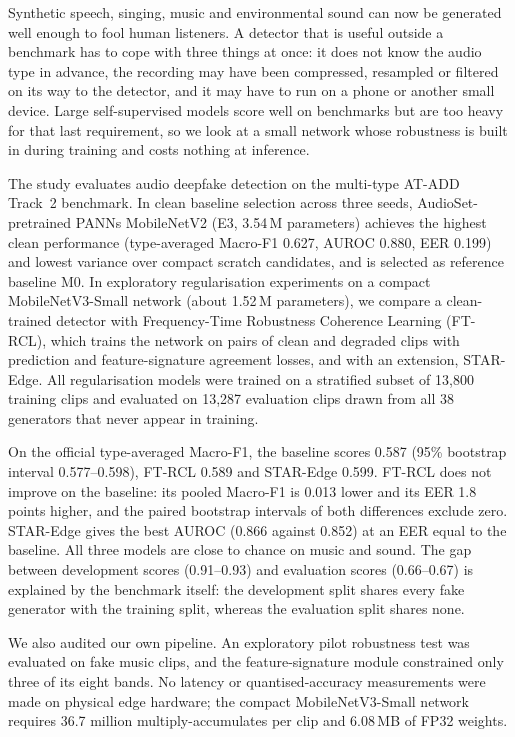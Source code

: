 Synthetic speech, singing, music and environmental sound can now be generated well enough to fool human listeners. A detector that is useful outside a benchmark has to cope with three things at once: it does not know the audio type in advance, the recording may have been compressed, resampled or filtered on its way to the detector, and it may have to run on a phone or another small device. Large self-supervised models score well on benchmarks but are too heavy for that last requirement, so we look at a small network whose robustness is built in during training and costs nothing at inference.

The study evaluates audio deepfake detection on the multi-type AT-ADD Track~2 benchmark. In clean baseline selection across three seeds, AudioSet-pretrained PANNs MobileNetV2 (E3, 3.54\,M parameters) achieves the highest clean performance (type-averaged Macro-F1 0.627, AUROC 0.880, EER 0.199) and lowest variance over compact scratch candidates, and is selected as reference baseline M0. In exploratory regularisation experiments on a compact MobileNetV3-Small network (about 1.52\,M parameters), we compare a clean-trained detector with Frequency-Time Robustness Coherence Learning (FT-RCL), which trains the network on pairs of clean and degraded clips with prediction and feature-signature agreement losses, and with an extension, STAR-Edge. All regularisation models were trained on a stratified subset of 13{,}800 training clips and evaluated on 13{,}287 evaluation clips drawn from all 38 generators that never appear in training.

On the official type-averaged Macro-F1, the baseline scores 0.587 (95\% bootstrap interval 0.577--0.598), FT-RCL 0.589 and STAR-Edge 0.599. FT-RCL does not improve on the baseline: its pooled Macro-F1 is 0.013 lower and its EER 1.8 points higher, and the paired bootstrap intervals of both differences exclude zero. STAR-Edge gives the best AUROC (0.866 against 0.852) at an EER equal to the baseline. All three models are close to chance on music and sound. The gap between development scores (0.91--0.93) and evaluation scores (0.66--0.67) is explained by the benchmark itself: the development split shares every fake generator with the training split, whereas the evaluation split shares none.

We also audited our own pipeline. An exploratory pilot robustness test was evaluated on fake music clips, and the feature-signature module constrained only three of its eight bands. No latency or quantised-accuracy measurements were made on physical edge hardware; the compact MobileNetV3-Small network requires 36.7 million multiply-accumulates per clip and 6.08\,MB of FP32 weights.
